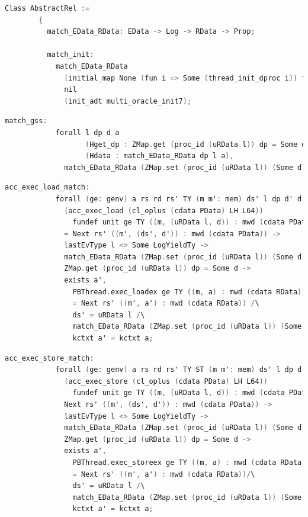 \begin{lstlisting}[language=C]
      Class AbstractRel :=
        {
          match_EData_RData: EData -> Log -> RData -> Prop;

          match_init:
            match_EData_RData
              (initial_map None (fun i => Some (thread_init_dproc i)) full_thread_list)
              nil
              (init_adt multi_oracle_init7);
\end{lstlisting}
         
\begin{lstlisting}[language=C]          
          match_gss:
            forall l dp d a
                   (Hget_dp : ZMap.get (proc_id (uRData l)) dp = Some d)
                   (Hdata : match_EData_RData dp l a),
              match_EData_RData (ZMap.set (proc_id (uRData l)) (Some d) dp) l a;
\end{lstlisting}
         
\begin{lstlisting}[language=C]          
          acc_exec_load_match:
            forall (ge: genv) a rs rd rs' TY (m m': mem) ds' l dp d' d addr,
              (acc_exec_load (cl_oplus (cdata PData) LH L64)) 
                fundef unit ge TY ((m, (uRData l, d)) : mwd (cdata PData)) addr rs rd 
              = Next rs' ((m', (ds', d')) : mwd (cdata PData)) ->
              lastEvType l <> Some LogYieldTy ->
              match_EData_RData (ZMap.set (proc_id (uRData l)) (Some d) dp) l a ->
              ZMap.get (proc_id (uRData l)) dp = Some d ->
              exists a',
                PBThread.exec_loadex ge TY ((m, a) : mwd (cdata RData)) addr rs rd 
                = Next rs' ((m', a') : mwd (cdata RData)) /\
                ds' = uRData l /\
                match_EData_RData (ZMap.set (proc_id (uRData l)) (Some d') dp) l a' /\
                kctxt a' = kctxt a;
\end{lstlisting}
         
\begin{lstlisting}[language=C]     
          acc_exec_store_match:
            forall (ge: genv) a rs rd rs' TY ST (m m': mem) ds' l dp d' d addr,
              (acc_exec_store (cl_oplus (cdata PData) LH L64)) 
                fundef unit ge TY ((m, (uRData l, d)) : mwd (cdata PData)) addr rs rd ST =
              Next rs' ((m', (ds', d')) : mwd (cdata PData)) -> 
              lastEvType l <> Some LogYieldTy ->
              match_EData_RData (ZMap.set (proc_id (uRData l)) (Some d) dp) l a ->
              ZMap.get (proc_id (uRData l)) dp = Some d ->
              exists a',
                PBThread.exec_storeex ge TY ((m, a) : mwd (cdata RData)) addr rs rd ST 
                = Next rs' ((m', a') : mwd (cdata RData))/\
                ds' = uRData l /\
                match_EData_RData (ZMap.set (proc_id (uRData l)) (Some d') dp) l a' /\
                kctxt a' = kctxt a;
\end{lstlisting}
         

